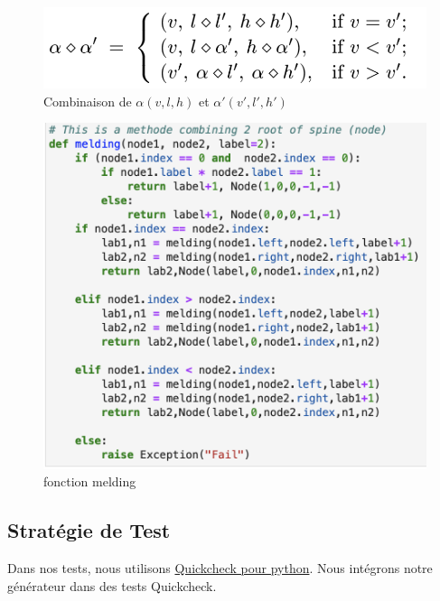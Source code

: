 \documentclass[french]{article}
\begin{document}
\begin{figure}[h!]
    \centering
    \includegraphics[scale=0.5]{melding_formula.png}
    \caption{Combinaison de $\alpha(v,l,h)$ et $\alpha'(v',l',h')$}
    \label{fig:melding_formula}
\end{figure}

\begin{figure}[h!]
    \centering
    \includegraphics[scale=0.6]{melding_function.png}
    \caption{fonction melding}
    \label{fig:melding_function}
\end{figure}


\subsection{Stratégie de Test}
Dans nos tests, nous utilisons \href{https://github.com/HypothesisWorks/hypothesis}{Quickcheck pour python}. Nous intégrons notre générateur dans des tests Quickcheck.\newline
\end{document}
